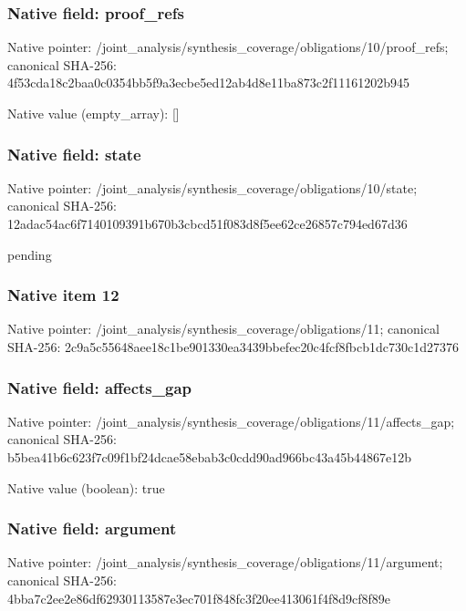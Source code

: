 \documentclass[10pt,a4paper]{article}
\begin{document}
\subsubsection{Native field: proof\_\allowbreak{}refs}
Native pointer: /joint\_\allowbreak{}analysis/synthesis\_\allowbreak{}coverage/obligations/10/proof\_\allowbreak{}refs; canonical SHA-256: 4f53cda18c2baa0c0354bb5f9a3ecbe5ed12ab4d8e11ba873c2f11161202b945

Native value (empty\_\allowbreak{}array): []

\subsubsection{Native field: state}
Native pointer: /joint\_\allowbreak{}analysis/synthesis\_\allowbreak{}coverage/obligations/10/state; canonical SHA-256: 12adac54ac6f7140109391b670b3cbcd51f083d8f5ee62ce26857c794ed67d36

\begingroup\raggedright\sloppy pending\par\endgroup

\subsubsection{Native item 12}
Native pointer: /joint\_\allowbreak{}analysis/synthesis\_\allowbreak{}coverage/obligations/11; canonical SHA-256: 2c9a5c55648aee18c1be901330ea3439bbefec20c4fcf8fbcb1dc730c1d27376

\subsubsection{Native field: affects\_\allowbreak{}gap}
Native pointer: /joint\_\allowbreak{}analysis/synthesis\_\allowbreak{}coverage/obligations/11/affects\_\allowbreak{}gap; canonical SHA-256: b5bea41b6c623f7c09f1bf24dcae58ebab3c0cdd90ad966bc43a45b44867e12b

Native value (boolean): true

\subsubsection{Native field: argument}
Native pointer: /joint\_\allowbreak{}analysis/synthesis\_\allowbreak{}coverage/obligations/11/argument; canonical SHA-256: 4bba7c2ee2e86df62930113587e3ec701f848fc3f20ee413061f4f8d9cf8f89e
\end{document}

